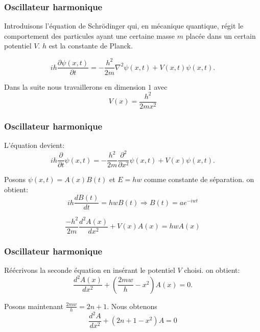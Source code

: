 \documentclass[xcolor=dvipsnames,10pt,mathserif]{beamer}
\theoremstyle{plain}
\begin{document}
\begin{frame}\frametitle{Oscillateur harmonique \hfill \insertpagenumber}

Introduisons l'équation de Schrödinger qui, en mécanique quantique, régit le comportement des particules ayant une certaine masse $m$ placée dans un certain potentiel $V$. $h$ est la constante de Planck.
\begin{block}{}
\begin{equation}
ih\frac{\partial\psi(x,t)}{\partial t}= -\frac{h^2}{2m} \nabla^2 \psi(x,t)+V(x,t)\psi(x,t).
\end{equation}
\end{block}

\pause

Dans la suite nous travaillerons en dimension $1$ avec 
\begin{equation}
V(x)=\frac{h^2}{2mx^2}
\end{equation}

\end{frame}
\begin{frame}\frametitle{Oscillateur harmonique \hfill \insertpagenumber}

L'équation devient: 
\begin{equation}
ih\frac{\partial}{\partial t} \psi(x,t)= -\frac{h^2}{2m}\frac{\partial^2}{\partial x^2} \psi(x,t)+V(x)\psi(x,t).
\end{equation}

Posons $\psi(x,t)=A(x)B(t)$ et $E=hw$ comme constante de séparation. on obtient:
\begin{equation}
ih\frac{dB(t)}{dt} = hwB(t) \Longrightarrow B(t)=ae^{-iwt}
\end{equation}

\begin{equation}
\frac{-h^2}{2m}\frac{d^2A(x)}{dx^2}+V(x)A(x)= hwA(x)
\end{equation}

\end{frame}


\begin{frame}\frametitle{Oscillateur harmonique \hfill \insertpagenumber}

Réécrivons la seconde équation en insérant le potentiel $V$ choisi.
on obtient: 
\begin{equation}
\frac{d^2A(x)}{dx^2}+\left(\frac{2mw}{h}-x^2\right) A(x)=0.
\end{equation} 

\pause

Posons maintenant $\frac{2mw}{h}=2n+1$.
Nous obtenons 
\begin{equation}
\frac{d^2A}{dx^2}+(2n+1-x^2)A=0
\end{equation}

\end{frame}
\end{document}
